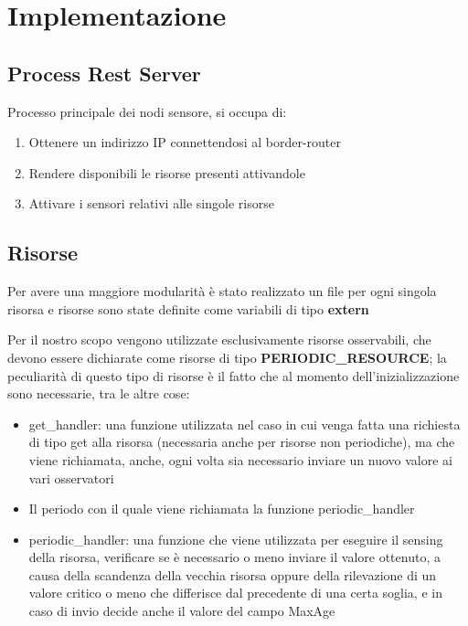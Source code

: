   \section{Implementazione}
    \subsection{Process Rest Server}
      Processo principale dei nodi sensore, si occupa di:
      \begin{enumerate}
        \item Ottenere un indirizzo IP connettendosi al border-router
        \item Rendere disponibili le risorse presenti attivandole
        \item Attivare i sensori relativi alle singole risorse
      \end{enumerate}


      

    \subsection{Risorse}
      Per avere una maggiore modularità è stato realizzato un file per ogni singola risorsa e risorse sono state definite come variabili di tipo \textbf{extern}

      

      Per il nostro scopo vengono utilizzate esclusivamente risorse osservabili, che devono essere dichiarate come risorse di tipo \textbf{PERIODIC\_RESOURCE};
      la peculiarità di questo tipo di risorse è il fatto che al momento dell'inizializzazione sono necessarie, tra le altre cose:
      \begin{itemize}
        \item get\_handler: una funzione utilizzata nel caso in cui venga fatta una richiesta di tipo get alla risorsa (necessaria anche per risorse non periodiche),
              ma che viene richiamata, anche, ogni volta sia necessario inviare un nuovo valore ai vari osservatori
        \item Il periodo con il quale viene richiamata la funzione periodic\_handler
        \item periodic\_handler: una funzione che viene utilizzata per eseguire il sensing della risorsa, verificare se è necessario o meno inviare il valore ottenuto, a causa
              della scandenza della vecchia risorsa oppure della rilevazione di un valore critico o meno che differisce dal precedente di una certa soglia, e in caso di invio
              decide anche il valore del campo MaxAge
      \end{itemize}

